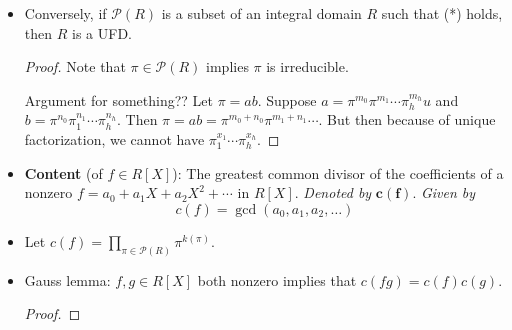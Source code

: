 \documentclass[../notes.tex]{subfiles}
\begin{document}
\begin{itemize}
    \begin{equation*}
        \alpha = u\prod_{\pi\in\mathcal{P}(R)}\pi^{k(\pi)}
    \end{equation*}
    where $u\in R^\times$ and for all $\pi$, $k(\pi)\in\Zg$ and $|\{\pi\in\mathcal{P}(R):k(\pi)>0\}|$ is finite.
    \begin{proof}
        $R$ is a UFD implies (*).
    \end{proof}
    \item Conversely, if $\mathcal{P}(R)$ is a subset of an integral domain $R$ such that (*) holds, then $R$ is a UFD.
    \begin{proof}
        Note that $\pi\in\mathcal{P}(R)$ implies $\pi$ is irreducible.\par
        Argument for something?? Let $\pi=ab$. Suppose $a=\pi^{m_0}\pi^{m_1}\cdots\pi_h^{m_h}u$ and $b=\pi^{n_0}\pi_1^{n_1}\cdots\pi_h^{n_h}$. Then $\pi=ab=\pi^{m_0+n_0}\pi^{m_1+n_1}\cdots$. But then because of unique factorization, we cannot have $\pi_1^{x_1}\cdots\pi_h^{x_h}$.
    \end{proof}
    \item \textbf{Content} (of $f\in R[X]$): The greatest common divisor of the coefficients of a nonzero $f=a_0+a_1X+a_2X^2+\cdots$ in $R[X]$. \emph{Denoted by} $\bm{c(f)}$. \emph{Given by}
    \begin{equation*}
        c(f) = \gcd(a_0,a_1,a_2,\dots)
    \end{equation*}
    \item Let $c(f)=\prod_{\pi\in\mathcal{P}(R)}\pi^{k(\pi)}$.
    \item Gauss lemma: $f,g\in R[X]$ both nonzero implies that $c(fg)=c(f)c(g)$.
    \begin{proof}


\end{proof}
\end{itemize}
\end{document}

